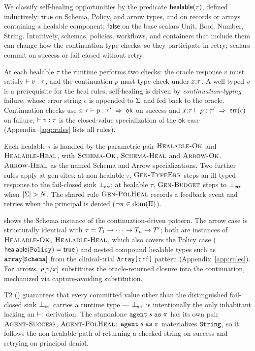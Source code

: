 We classify self-healing opportunities by the predicate $\Healable{\tau}$,
defined inductively: $\mathsf{true}$ on Schema, Policy, and arrow types,
and on records or arrays containing a healable component;
$\mathsf{false}$ on the base scalars Unit, Bool, Number, String.
Intuitively, schemas, policies, workflows, and containers that include
them can change how the continuation type-checks, so they participate
in retry; scalars commit on success or fail closed without retry.

At each healable $\tau$ the runtime performs two checks: the oracle
response $v$ must satisfy $\StType{v}{\tau}$, and the continuation $p$
must type-check under $\Gext{x}{\tau}$. A well-typed $v$ is a
prerequisite for the heal rules; self-healing is driven by
\emph{continuation-typing} failure, whose error string $\epsilon$ is
appended to $\MErr$ and fed back to the oracle. Continuation checks use
$\TJok{\Gext{x}{\tau}}{p}{\tau'}$ on success and
$\TJerr{\Gext{x}{\tau}}{p}{\tau'}{\epsilon}$ on failure;
$\StType{v}{\tau}$ is the closed-value specialization of the $\mathsf{ok}$
case (Appendix~\ref{app:rules} lists all rules).

Each healable $\tau$ is handled by the parametric pair
$\rulename{Healable-Ok}$ and $\rulename{Healable-Heal}$, with
$\rulename{Schema-Ok}$, $\rulename{Schema-Heal}$ and
$\rulename{Arrow-Ok}$, $\rulename{Arrow-Heal}$ as the named Schema and
Arrow specializations. Two further rules apply at gen sites: at
non-healable $\tau$, $\rulename{Gen-TypeErr}$ steps an ill-typed
response to the fail-closed sink $\errV$; at healable $\tau$,
$\rulename{Gen-Budget}$ steps to $\errV$ when $|\MErr| > \MRetry$. The
shared rule $\rulename{Gen-PolHeal}$ records a feedback event and
retries when the principal is denied
($\lnot\PolAllow{\MPol}{\MPrin}{\texttt{gen}}$).

 shows the Schema instance of the
continuation-driven pattern. The arrow case is structurally identical
with $\tau = \Tarrow{T_1 \to \cdots \to T_n}{T'}$; both are instances of
$\rulename{Healable-Ok}$, $\rulename{Healable-Heal}$, which also covers
the Policy case ($\Healable{\Tpolicy} = \mathsf{true}$) and nested
compound healable types such as $\Tarr{\Tschema}$ from the
clinical-trial \texttt{Array[crf]} pattern (Appendix~\ref{app:rules}).
For arrows, $\Subst{p}{v}$ substitutes the oracle-returned closure into
the continuation, mechanized via capture-avoiding substitution.

T2 () guarantees that every committed value
other than the distinguished fail-closed sink $\errV$ carries a runtime
type --- $\errV$ is intentionally the only inhabitant lacking an
$\StType{}{}$ derivation. The standalone $\Agent{s}{\MPrin}$ has its
own pair $\rulename{Agent-Success}$, $\rulename{Agent-PolHeal}$:
$\Agent{s}{\MPrin}$ materializes $\Tstring$, so it follows the
non-healable path of returning a checked string on success and retrying
on principal denial.

